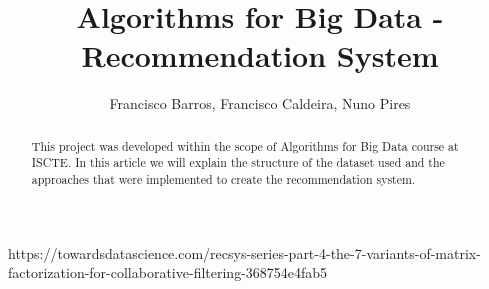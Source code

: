 \documentclass{article}
\title{Algorithms for Big Data - Recommendation System}
\author{Francisco Barros, Francisco Caldeira, Nuno Pires}
\begin{document}
\maketitle

\begin{abstract}
    This project was developed within the scope of Algorithms for Big Data course at ISCTE. 
    In this article we will explain the structure of the dataset used and the approaches that were implemented to create the recommendation system.
\end{abstract}





https://towardsdatascience.com/recsys-series-part-4-the-7-variants-of-matrix-factorization-for-collaborative-filtering-368754e4fab5
\end{document}
